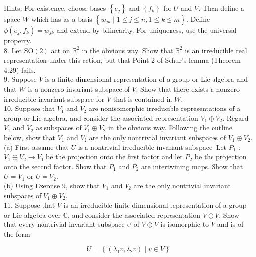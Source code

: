 \documentclass[10pt, letterpaper]{article}
\begin{document}
Hints: For existence, choose bases $\left\{e_{j}\right\}$ and $\left\{f_{k}\right\}$ for $U$ and $V$. Then define a space $W$ which has as a basis $\left\{w_{j k} \mid 1 \leq j \leq n, 1 \leq k \leq m\right\}$. Define $\phi\left(e_{j}, f_{k}\right)=w_{j k}$ and extend by bilinearity. For uniqueness, use the universal property.\\
8. Let $\mathrm{SO}(2)$ act on $\mathbb{R}^{2}$ in the obvious way. Show that $\mathbb{R}^{2}$ is an irreducible real representation under this action, but that Point 2 of Schur's lemma (Theorem 4.29) fails.\\
9. Suppose $V$ is a finite-dimensional representation of a group or Lie algebra and that $W$ is a nonzero invariant subspace of $V$. Show that there exists a nonzero irreducible invariant subspace for $V$ that is contained in $W$.\\
10. Suppose that $V_{1}$ and $V_{2}$ are nonisomorphic irreducible representations of a group or Lie algebra, and consider the associated representation $V_{1} \oplus V_{2}$. Regard $V_{1}$ and $V_{2}$ as subspaces of $V_{1} \oplus V_{2}$ in the obvious way. Following the outline below, show that $V_{1}$ and $V_{2}$ are the only nontrivial invariant subspaces of $V_{1} \oplus V_{2}$.\\
(a) First assume that $U$ is a nontrivial irreducible invariant subspace. Let $P_{1}$ : $V_{1} \oplus V_{2} \rightarrow V_{1}$ be the projection onto the first factor and let $P_{2}$ be the projection onto the second factor. Show that $P_{1}$ and $P_{2}$ are intertwining maps. Show that $U=V_{1}$ or $U=V_{2}$.\\
(b) Using Exercise 9, show that $V_{1}$ and $V_{2}$ are the only nontrivial invariant subspaces of $V_{1} \oplus V_{2}$.\\
11. Suppose that $V$ is an irreducible finite-dimensional representation of a group or Lie algebra over $\mathbb{C}$, and consider the associated representation $V \oplus V$. Show that every nontrivial invariant subspace $U$ of $V \oplus V$ is isomorphic to $V$ and is of the form

$$
U=\left\{\left(\lambda_{1} v, \lambda_{2} v\right) \mid v \in V\right\}
$$
\end{document}
